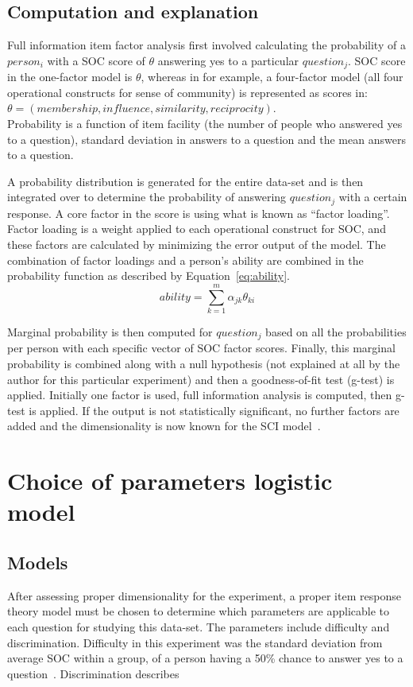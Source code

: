 \documentclass{sig-alternate}
\begin{document}
\subsection{Computation and explanation}
Full information item factor analysis first involved calculating the probability of a $person_i$ with a SOC score of $\theta$ answering yes to a particular $question_j$. SOC score in the one-factor model is $\theta$, whereas in for example, a four-factor model (all four operational constructs for sense of community) is represented as scores in: \\$\theta = (membership, influence, similarity, reciprocity)$.\\ Probability is a function of item facility (the number of people who answered yes to a question), standard deviation in answers to a question and the mean answers to a question. 

A probability distribution is generated for the entire data-set and is then integrated over to determine the probability of answering $question_j$ with a certain response. A core factor in the score is using what is known as ``factor loading''. Factor loading is a weight applied to each operational construct for SOC, and these factors are calculated by minimizing the error output of the model. The combination of factor loadings and a person's ability are combined in the probability function as described by Equation~\ref{eq:ability}.
\begin{equation}
\label{eq:ability}
ability = \sum\limits_{k = 1}^{m} \alpha_{jk} \theta_{ki}
\end{equation}

Marginal probability is then computed for $question_j$ based on all the probabilities per person with each specific vector of SOC factor scores. Finally, this marginal probability is combined along with a null hypothesis (not explained at all by the author for this particular experiment) and then a goodness-of-fit test (g-test) is applied. Initially one factor is used, full information analysis is computed, then g-test is applied. If the output is not statistically significant, no further factors are added and the dimensionality is now known for the SCI model~\cite{analysis:1988}.

\section{Choice of parameters logistic model}
\subsection{Models}
After assessing proper dimensionality for the experiment, a proper item response theory model must be chosen to determine which parameters are applicable to each question for studying this data-set. The parameters include difficulty and discrimination. Difficulty in this experiment was the standard deviation from average SOC within a group, of a person having a 50\% chance to answer yes to a question~\cite{disparities:2009}. Discrimination describes 
\end{document}
